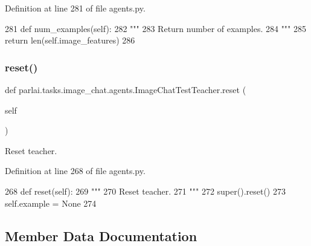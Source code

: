 Definition at line 281 of file agents.\+py.


\begin{DoxyCode}
281     \textcolor{keyword}{def }num\_examples(self):
282         \textcolor{stringliteral}{"""}
283 \textcolor{stringliteral}{        Return number of examples.}
284 \textcolor{stringliteral}{        """}
285         \textcolor{keywordflow}{return} len(self.image\_features)
286 
\end{DoxyCode}
\mbox{\label{classparlai_1_1tasks_1_1image__chat_1_1agents_1_1ImageChatTestTeacher_ad1e01dc7e43fdba0bd7d82b1ac860e83}} 
\subsubsection{\texorpdfstring{reset()}{reset()}}
{\footnotesize\ttfamily def parlai.\+tasks.\+image\+\_\+chat.\+agents.\+Image\+Chat\+Test\+Teacher.\+reset (\begin{DoxyParamCaption}\item[{}]{self }\end{DoxyParamCaption})}

\begin{DoxyVerb}Reset teacher.
\end{DoxyVerb}
 

Definition at line 268 of file agents.\+py.


\begin{DoxyCode}
268     \textcolor{keyword}{def }reset(self):
269         \textcolor{stringliteral}{"""}
270 \textcolor{stringliteral}{        Reset teacher.}
271 \textcolor{stringliteral}{        """}
272         super().reset()
273         self.example = \textcolor{keywordtype}{None}
274 
\end{DoxyCode}


\subsection{Member Data Documentation}
\mbox{\label{classparlai_1_1tasks_1_1image__chat_1_1agents_1_1ImageChatTestTeacher_a7a723dab72ffcb3a7b39d0548fec9e79}} 
